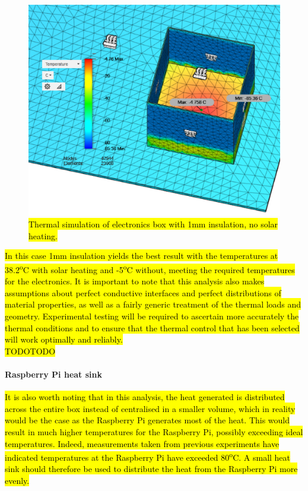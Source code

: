 	\begin{figure}[H]
    \centering  
    \includegraphics[scale=0.65]{4-experiment-design/img/mechanical/1mmthicknoheat.PNG}
	\caption{\hl{Thermal simulation of electronics box with 1mm insulation, no solar heating.}}
	\label{fig:1mmthicknoheat}    
    	\end{figure}
	
\hl{In this case 1mm insulation yields the best result with the temperatures at 38.2\textsuperscript{o}C with solar heating and -5\textsuperscript{o}C without, meeting the required temperatures for the electronics. It is important to note that this analysis also makes assumptions about perfect conductive interfaces and perfect distributions of material properties, as well as a fairly generic treatment of the thermal loads and geometry. Experimental testing will be required to ascertain more accurately the thermal conditions and to ensure that the thermal control that has been selected will work optimally and reliably.} \\

\hl{TODOTODO}




\paragraph{Raspberry Pi heat sink}

\hl{It is also worth noting that in this analysis, the heat generated is distributed across the entire box instead of centralised in a smaller volume, which in reality would be the case as the Raspberry Pi generates most of the heat. This would result in much higher temperatures for the Raspberry Pi, possibly exceeding ideal temperatures. Indeed, measurements taken from previous experiments have indicated temperatures at the Raspberry Pi have exceeded 80\textsuperscript{o}C. A small heat sink should therefore be used to distribute the heat from the Raspberry Pi more evenly.} \\ 

